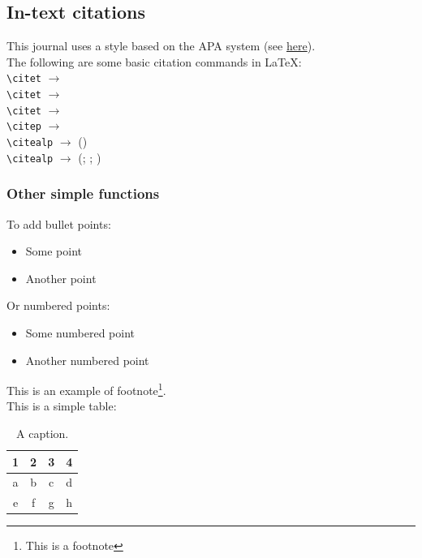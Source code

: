 \documentclass{article}
\begin{document}
\subsection{In-text citations}
This journal uses a style based on the APA system (see \href{https://openhumanitiesdata.metajnl.com/about/submissions/#References}{here}). \\
The following are some basic citation commands in \LaTeX: \\

\noindent
\verb|\citet| $\rightarrow$ \citet{jenset&mcgil}\\
\verb|\citet| $\rightarrow$ \citet{australiashealth}\\
\verb|\citet| $\rightarrow$ \citet{shree-a}\\
\verb|\citep| $\rightarrow$ \citep{fabricius-hansen2012b}\\
\verb|\citealp| $\rightarrow$ (\citealp{eckhoff2018a})\\
\verb|\citealp| $\rightarrow$ (\citealp{eckhoff2018a}; \citealp{fabricius-hansen2012b}; \citealp{shree-a})\\

\subsubsection{Other simple functions}
To add bullet points:

\begin{itemize}
    \item Some point
    \item Another point
\end{itemize}

\noindent Or numbered points:

\begin{itemize}
    \item[1.] Some numbered point
    \item[2.] Another numbered point
\end{itemize}

\noindent This is an example of footnote\footnote{This is a footnote}. \\

\noindent This is a simple table:

\begin{table}[H]
\centering %
\caption{\label{tab1} A caption.}
\begin{tabular}{cccc}
\hline
1 & 2 & 3 & 4 \\
\hline
a & b & c & d\\
e & f & g & h\\
\hline
\end{tabular}
\end{table}
\end{document}
